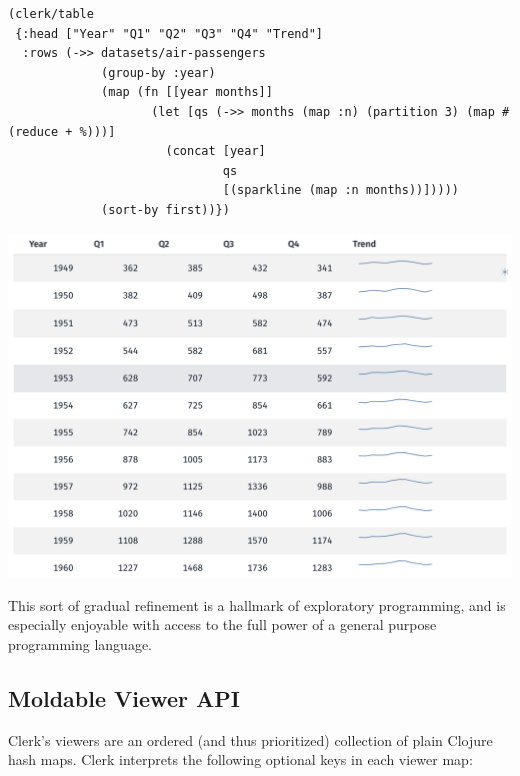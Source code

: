 \documentclass[sigconf,screen,pbalance=true]{acmart}
\begin{document}
\begin{minipage}{\linewidth}
\begin{lstlisting}
(clerk/table
 {:head ["Year" "Q1" "Q2" "Q3" "Q4" "Trend"]
  :rows (->> datasets/air-passengers
             (group-by :year)
             (map (fn [[year months]]
                    (let [qs (->> months (map :n) (partition 3) (map #(reduce + %)))]
                      (concat [year] 
                              qs 
                              [(sparkline (map :n months))]))))
             (sort-by first))})
\end{lstlisting}
\end{minipage}

\includegraphics{images/anon-expr-5dsSs4YJ9LYoxsu8USvFMpW5wGuDa3-result.png}

This sort of gradual refinement is a hallmark of exploratory programming, and is especially enjoyable with access to the full power of a general purpose programming language.

\hypertarget{moldable-viewer-api}{%
\subsection{Moldable Viewer API}\label{moldable-viewer-api}}

Clerk's viewers are an ordered (and thus prioritized) collection of plain Clojure hash maps. Clerk interprets the following optional keys in each viewer map:
\end{document}
